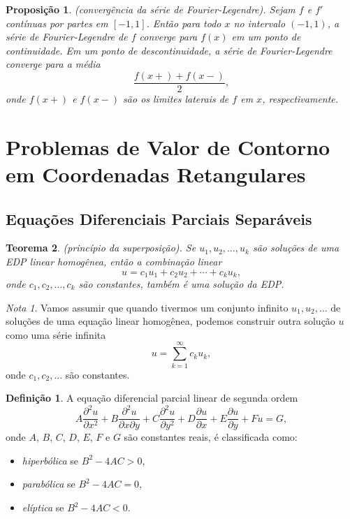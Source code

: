 \documentclass{article}
\theoremstyle{plain}
\newtheorem{thm}{Teorema}[section]
\newtheorem{prop}[thm]{Proposição}
\theoremstyle{definition}
\newtheorem{defn}{Definição}[section]
\theoremstyle{remark}
\newtheorem*{rem}{Nota}
\begin{document}
\begin{prop} (convergência da série de Fourier-Legendre).
    Sejam \(f\) e \(f'\) contínuas por partes em \([-1,1]\). Então para todo \(x\) no intervalo \((-1,1)\), a série de Fourier-Legendre de \(f\) converge para \(f(x)\) em um ponto de continuidade. Em um ponto de descontinuidade, a série de Fourier-Legendre converge para a média
    \begin{equation*}
        \frac{f(x+) + f(x-)}{2},
    \end{equation*}
    \noindent onde \(f(x+)\) e \(f(x-)\) são os limites laterais de \(f\) em \(x\), respectivamente.
\end{prop}

\section{Problemas de Valor de Contorno em Coordenadas Retangulares}

\subsection{Equações Diferenciais Parciais Separáveis}

\begin{thm} (princípio da superposição).
    Se \(u_1, u_2, \ldots, u_k\) são soluções de uma EDP linear homogênea, então a combinação linear
    \begin{equation}
        u = c_1 u_1 + c_2 u_2 + \cdots + c_k u_k,
    \end{equation}
    \noindent onde \(c_1, c_2, \ldots, c_k\) são constantes, também é uma solução da EDP.
\end{thm}

\begin{rem}
    Vamos assumir que quando tivermos um conjunto infinito \(u_1, u_2, \ldots\) de soluções de uma equação linear homogênea, podemos construir outra solução \(u\) como uma série infinita
    \begin{equation}
        u = \sum_{k=1}^{\infty} c_k u_k,
    \end{equation}
    \noindent onde \(c_1, c_2, \ldots\) são constantes.
\end{rem}

\begin{defn}
    A equação diferencial parcial linear de segunda ordem
    \begin{equation}
        A \frac{\partial^2 u}{\partial x^2} + B \frac{\partial^2 u}{\partial x \partial y} + C \frac{\partial^2 u}{\partial y^2} + D \frac{\partial u}{\partial x} + E \frac{\partial u}{\partial y} + F u = G,
    \end{equation}
    \noindent onde \(A\), \(B\), \(C\), \(D\), \(E\), \(F\) e \(G\) são constantes reais, é classificada como:
    \begin{itemize}
        \item \emph{hiperbólica} se \(B^2 - 4AC > 0\),
        \item \emph{parabólica} se \(B^2 - 4AC = 0\),
        \item \emph{elíptica} se \(B^2 - 4AC < 0\).
    \end{itemize}
\end{defn}
\end{document}
